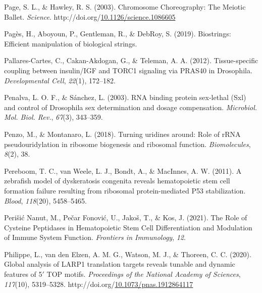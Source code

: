 \documentclass[12pt,oneside]{reedthesis}
\newlength{\cslhangindent}
\newenvironment{CSLReferences}[2] %
 {%
  \setlength{\parindent}{0pt}
  \ifodd #1 \everypar{\setlength{\hangindent}{\cslhangindent}}\ignorespaces\fi
  \ifnum #2 > 0
  \setlength{\parskip}{#2\baselineskip}
  \fi
 }%
 {}
\begin{document}
\begin{CSLReferences}{1}{0}
\leavevmode{}%
Page, S. L., \& Hawley, R. S. (2003). Chromosome {Choreography}: {The Meiotic Ballet}. \emph{Science}. http://doi.org/\href{https://doi.org/10.1126/science.1086605}{10.1126/science.1086605}

\leavevmode{}%
Pagès, H., Aboyoun, P., Gentleman, R., \& DebRoy, S. (2019). Biostrings: {Efficient} manipulation of biological strings.

\leavevmode{}%
Pallares-Cartes, C., Cakan-Akdogan, G., \& Teleman, A. A. (2012). Tissue-specific coupling between insulin/{IGF} and {TORC1} signaling via {PRAS40} in {Drosophila}. \emph{Developmental Cell}, \emph{22}(1), 172--182.

\leavevmode{}%
Penalva, L. O. F., \& Sánchez, L. (2003). {RNA} binding protein sex-lethal ({Sxl}) and control of {Drosophila} sex determination and dosage compensation. \emph{Microbiol. Mol. Biol. Rev.}, \emph{67}(3), 343--359.

\leavevmode{}%
Penzo, M., \& Montanaro, L. (2018). Turning uridines around: {Role} of {rRNA} pseudouridylation in ribosome biogenesis and ribosomal function. \emph{Biomolecules}, \emph{8}(2), 38.

\leavevmode{}%
Pereboom, T. C., van Weele, L. J., Bondt, A., \& MacInnes, A. W. (2011). A zebrafish model of dyskeratosis congenita reveals hematopoietic stem cell formation failure resulting from ribosomal protein-mediated P53 stabilization. \emph{Blood}, \emph{118}(20), 5458--5465.

\leavevmode{}%
Perišić Nanut, M., Pečar Fonović, U., Jakoš, T., \& Kos, J. (2021). The {Role} of {Cysteine Peptidases} in {Hematopoietic Stem Cell Differentiation} and {Modulation} of {Immune System Function}. \emph{Frontiers in Immunology}, \emph{12}.

\leavevmode{}%
Philippe, L., van den Elzen, A. M. G., Watson, M. J., \& Thoreen, C. C. (2020). Global analysis of {LARP1} translation targets reveals tunable and dynamic features of 5{\({'}\)} {TOP} motifs. \emph{Proceedings of the National Academy of Sciences}, \emph{117}(10), 5319--5328. http://doi.org/\href{https://doi.org/10.1073/pnas.1912864117}{10.1073/pnas.1912864117}


\end{CSLReferences}
\end{document}
